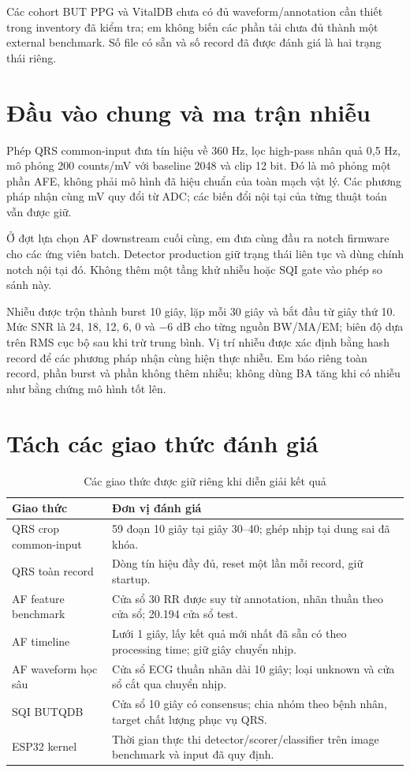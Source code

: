 \documentclass[12pt,a4paper,oneside]{report}
\begin{document}
Các cohort BUT PPG và VitalDB chưa có đủ waveform/annotation cần thiết trong inventory đã kiểm tra; em không biến các phần tải chưa đủ thành một external benchmark. Số file có sẵn và số record đã được đánh giá là hai trạng thái riêng.

\section{Đầu vào chung và ma trận nhiễu}
Phép QRS common-input đưa tín hiệu về 360 Hz, lọc high-pass nhân quả 0,5 Hz, mô phỏng 200 counts/mV với baseline 2048 và clip 12 bit. Đó là mô phỏng một phần AFE, không phải mô hình đã hiệu chuẩn của toàn mạch vật lý. Các phương pháp nhận cùng mV quy đổi từ ADC; các biến đổi nội tại của từng thuật toán vẫn được giữ.

Ở đợt lựa chọn AF downstream cuối cùng, em đưa cùng đầu ra notch firmware cho các ứng viên batch. Detector production giữ trạng thái liên tục và dùng chính notch nội tại đó. Không thêm một tầng khử nhiễu hoặc SQI gate vào phép so sánh này.

Nhiễu được trộn thành burst 10 giây, lặp mỗi 30 giây và bắt đầu từ giây thứ 10. Mức SNR là 24, 18, 12, 6, 0 và $-6$ dB cho từng nguồn BW/MA/EM; biên độ dựa trên RMS cục bộ sau khi trừ trung bình. Vị trí nhiễu được xác định bằng hash record để các phương pháp nhận cùng hiện thực nhiễu. Em báo riêng toàn record, phần burst và phần không thêm nhiễu; không dùng BA tăng khi có nhiễu như bằng chứng mô hình tốt lên.

\section{Tách các giao thức đánh giá}
\begin{table}[H]
\centering\small
\caption{Các giao thức được giữ riêng khi diễn giải kết quả}
\begin{tabularx}{\textwidth}{L{3.2cm}X}
\toprule Giao thức & Đơn vị đánh giá\\\midrule
QRS crop common-input & 59 đoạn 10 giây tại giây 30--40; ghép nhịp tại dung sai đã khóa.\\
QRS toàn record & Dòng tín hiệu đầy đủ, reset một lần mỗi record, giữ startup.\\
AF feature benchmark & Cửa sổ 30 RR được suy từ annotation, nhãn thuần theo cửa sổ; 20.194 cửa sổ test.\\
AF timeline & Lưới 1 giây, lấy kết quả mới nhất đã sẵn có theo processing time; giữ giây chuyển nhịp.\\
AF waveform học sâu & Cửa sổ ECG thuần nhãn dài 10 giây; loại unknown và cửa sổ cắt qua chuyển nhịp.\\
SQI BUTQDB & Cửa sổ 10 giây có consensus; chia nhóm theo bệnh nhân, target chất lượng phục vụ QRS.\\
ESP32 kernel & Thời gian thực thi detector/scorer/classifier trên image benchmark và input đã quy định.\\
\bottomrule
\end{tabularx}
\end{table}
\end{document}
